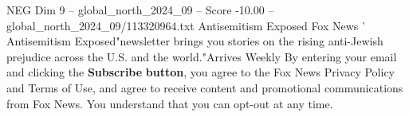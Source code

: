 \begin{textsample}{NEG Dim 9 – global\_north\_2024\_09 – Score -10.00 – global\_north\_2024\_09/113320964.txt}
Antisemitism Exposed Fox News ' Antisemitism Exposed"newsletter brings you stories on the rising anti-Jewish prejudice across the U.S. and the world."Arrives Weekly By entering your email and clicking the \textbf{Subscribe} \textbf{button}, you agree to the Fox News Privacy Policy and Terms of Use, and agree to receive content and promotional communications from Fox News.
You understand that you can opt-out at any time.

\end{textsample}
